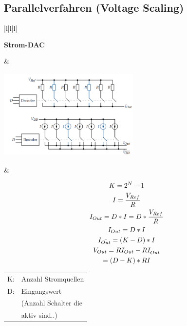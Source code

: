 \subsection{Parallelverfahren (Voltage Scaling)}
\begin{longtable}{|l|l|l|}
\hline
\begin{minipage}{4cm}
\textbf{Strom-DAC}
\end{minipage}
&
\begin{minipage}{7cm}
\includegraphics[width=7cm, height = 4.5cm]{pictures/Strom-DAC}
\end{minipage}

&
\begin{minipage}{6cm}
\begin{gather}
K=2^N-1\\
I=\frac{V_{Ref}}{R}\\
I_{Out}=D*I=D*\frac{V_{Ref}}{R}\\
I_{Out}=D*I\\
I_{\bar{Out}}=(K-D)*I\\
V_{Out}=RI_{Out}-RI_{\bar{Out}}\notag\\=(D-K)*RI
\end{gather}
\begin{tabular}{ll}
K:&Anzahl Stromquellen\\
D:&Eingangswert\\&(Anzahl Schalter die \\&aktiv sind..)
\end{tabular}
\end{minipage}


\end{longtable}
